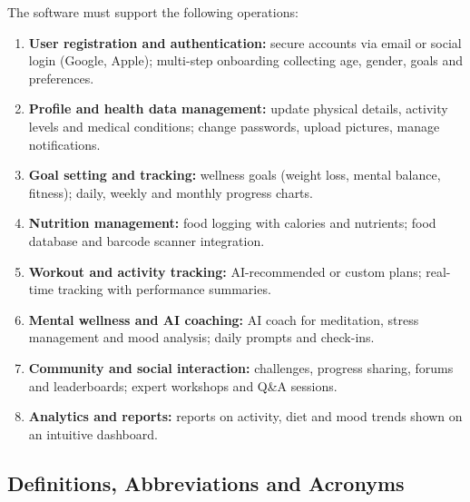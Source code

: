 \documentclass[11pt,a4paper]{report}
\begin{document}
The software must support the following operations:
\begin{enumerate}
 \item \textbf{User registration and authentication:} secure accounts via email or social login (Google, Apple); multi-step onboarding collecting age, gender, goals and preferences.
 \item \textbf{Profile and health data management:} update physical details, activity levels and medical conditions; change passwords, upload pictures, manage notifications.
 \item \textbf{Goal setting and tracking:} wellness goals (weight loss, mental balance, fitness); daily, weekly and monthly progress charts.
 \item \textbf{Nutrition management:} food logging with calories and nutrients; food database and barcode scanner integration.
 \item \textbf{Workout and activity tracking:} AI-recommended or custom plans; real-time tracking with performance summaries.
 \item \textbf{Mental wellness and AI coaching:} AI coach for meditation, stress management and mood analysis; daily prompts and check-ins.
 \item \textbf{Community and social interaction:} challenges, progress sharing, forums and leaderboards; expert workshops and Q\&A sessions.
 \item \textbf{Analytics and reports:} reports on activity, diet and mood trends shown on an intuitive dashboard.
\end{enumerate}

\subsection{Definitions, Abbreviations and Acronyms}
\end{document}

